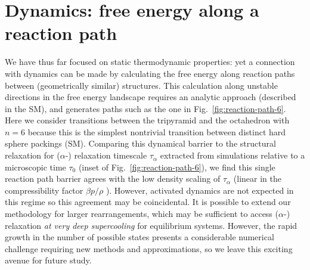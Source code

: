 \documentclass[11pt,twoside]{report}
\begin{document}

\section{Dynamics: free energy along a reaction path}

We have thus far focused on static thermodynamic properties: yet a connection with dynamics can be made by calculating the free energy along reaction paths between (geometrically similar) structures.
This calculation along unstable directions in the free energy landscape requires an analytic approach (described in the SM), and generates paths such as the one in Fig.\ \ref{fig:reaction-path-6}.
Here we consider transitions between the tripyramid and the octahedron with $n=6$ because this is the simplest nontrivial transition between distinct hard sphere packings (SM).
Comparing this dynamical barrier to the structural relaxation for ($\alpha$-) relaxation timescale $\tau_\alpha$ extracted from simulations relative to a microscopic time $\tau_0$ (inset of Fig.\ \ref{fig:reaction-path-6}), we find this single reaction path barrier agrees with the low density scaling of $\tau_\alpha$ (linear in the compressibility factor $\beta p / \rho$ \cite{BerthierPRE2009}).
However, activated dynamics are not expected in this regime so this agreement may be coincidental.
It is possible to extend our methodology for larger rearrangements, which may be sufficient to access ($\alpha$-) relaxation \emph{at very deep supercooling} for equilibrium systems.
However, the rapid growth in the number of possible states presents a considerable numerical challenge requiring new methods and approximations, so we leave this exciting avenue for future study.
\end{document}
